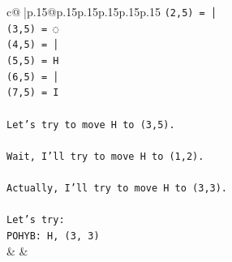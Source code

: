 \documentclass{article}
\begin{document}
{\begin{supertabular}{c@{$\;$}|p{.15\linewidth}@{}p{.15\linewidth}p{.15\linewidth}p{.15\linewidth}p{.15\linewidth}p{.15\linewidth}}
{{{\texttt{(2,5) = │} \\
\texttt{(3,5) = ◌} \\
\texttt{(4,5) = │} \\
\texttt{(5,5) = H} \\
\texttt{(6,5) = │} \\
\texttt{(7,5) = I} \\
\\ 
\texttt{Let's try to move H to (3,5).} \\
\\ 
\texttt{Wait, I'll try to move H to (1,2).} \\
\\ 
\texttt{Actually, I'll try to move H to (3,3).} \\
\\ 
\texttt{Let's try:} \\
\texttt{POHYB: H, (3, 3)} \\
            }
        }
    }
    & & \\ \\


\end{supertabular}}
\end{document}
